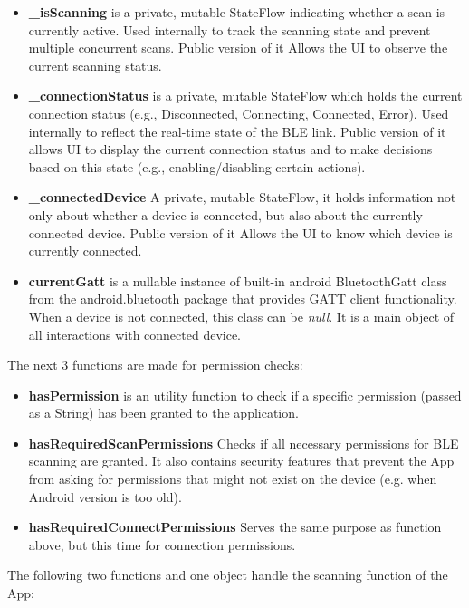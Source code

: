 \begin{itemize}
	\item \textbf{\_isScanning} is a private, mutable StateFlow indicating whether a scan is currently active. Used internally to track the scanning state and prevent multiple concurrent scans. Public version of it Allows the UI to observe the current scanning status.
	\item \textbf{\_connectionStatus} is a private, mutable StateFlow which holds the current connection status (e.g., Disconnected, Connecting, Connected, Error). Used internally to reflect the real-time state of the \ac{BLE} link. Public version of it allows UI to display the current connection status and to make decisions based on this state (e.g., enabling/disabling certain actions).
	\item \textbf{\_connectedDevice} A private, mutable StateFlow, it holds information not only about whether a device is connected, but also about the currently connected device. Public version of it Allows the UI to know which device is currently connected.
	\item \textbf{currentGatt} is a nullable instance of built-in android BluetoothGatt class from the android.bluetooth package\cite{android_bluetooth} that provides \ac{GATT} client functionality. When a device is not connected, this class can be \textit{null}. It is a main object of all interactions with connected device.
\end{itemize}
The next 3 functions are made for permission checks:
\begin{itemize}
	\item \textbf{hasPermission} is an utility function to check if a specific permission (passed as a String) has been granted to the application.
	\item \textbf{hasRequiredScanPermissions} Checks if all necessary permissions for \ac{BLE} scanning are granted. It also contains security features that prevent the App from asking for permissions that might not exist on the device (e.g. when Android version is too old).
	\item \textbf{hasRequiredConnectPermissions} Serves the same purpose as function above, but this time for connection permissions.
\end{itemize}
The following two functions and one object handle the scanning function of the App:
